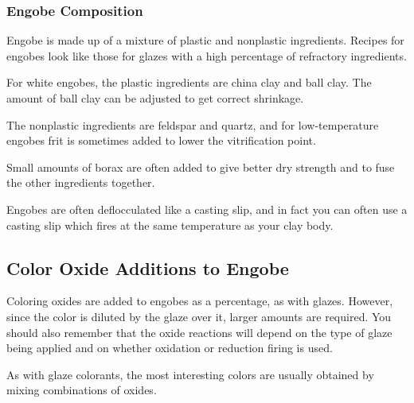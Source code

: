 \subsubsection{Engobe Composition}
Engobe is made up of a mixture of plastic and nonplastic ingredients. Recipes 
for engobes look like those for glazes with a high percentage of refractory 
ingredients.

For white engobes, the plastic ingredients are china clay and ball clay. The 
amount of ball clay can be adjusted to get correct shrinkage.

The nonplastic ingredients are feldspar and quartz, and for low-temperature 
engobes frit is sometimes added to lower the vitrification point.

Small amounts of borax are often added to give better dry strength and to fuse 
the other ingredients together.

Engobes are often deflocculated like a casting slip, and in fact you can often 
use a casting slip which fires at the same temperature as your clay body.
\subsection{Color Oxide Additions to Engobe}
Coloring oxides are added to engobes as a percentage, as with glazes. However, 
since the color is diluted by the glaze over it, larger amounts are required. 
You should also remember that the oxide reactions will depend on the type of 
glaze being applied and on whether oxidation or reduction firing is used. 

As with glaze colorants, the most interesting colors are usually obtained by 
mixing combinations of oxides.

